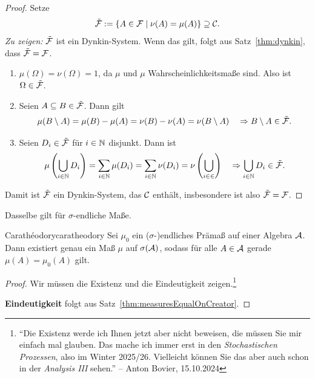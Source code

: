 \documentclass[language=ngerman]{../../Template/TemplateLecture}
\begin{document}
\begin{proof}
    Setze 
    \begin{equation}
        \tilde{\mathcal{F}} := \{A \in \mathcal{F} \mid \nu(A) = \mu(A)\} \supseteq \mathcal{C}.
    \end{equation}
    \emph{Zu zeigen:} $\tilde{\mathcal{F}}$ ist ein Dynkin-System. Wenn das gilt, folgt aus Satz~\ref{thm:dynkin}, dass $\tilde{\mathcal{F}} = \mathcal{F}$.
    \begin{enumerate}[(\greek*)]
        \item $\mu(\Omega) = \nu(\Omega) = 1$, da $\mu$ und $\mu$ Wahrscheinlichkeitsmaße sind. Also ist $\Omega \in \tilde{\mathcal{F}}$.
        \item Seien $A \subseteq B \in \tilde{\mathcal{F}}$. Dann gilt 
        \begin{equation}
            \mu(B \setminus A) = \mu(B) - \mu(A) = \nu(B) - \nu(A) = \nu(B \setminus A) \quad \Rightarrow B \setminus A \in \tilde{\mathcal{F}}.
        \end{equation}
        \item Seien $D_i \in \tilde{\mathcal{F}}$ für $i \in \mathbb{N}$ disjunkt. Dann ist 
        \begin{equation}
            \mu\left(\bigcup_{i \in \mathbb{N}} D_i\right) = \sum_{i \in \mathbb{N}} \mu(D_i) = \sum_{i \in \mathbb{N}} \nu(D_i) = \nu\left(\bigcup_{i \in \in}\right) \quad \Rightarrow \bigcup_{i \in \mathbb{N}} D_i \in \tilde{\mathcal{F}}.
        \end{equation}
    \end{enumerate}
    Damit ist $\tilde{\mathcal{F}}$ ein Dynkin-System, das $\mathcal{C}$ enthält, insbesondere ist also $\tilde{\mathcal{F}} = \mathcal{F}$.
\end{proof}

\begin{bemerkung}
    Dasselbe gilt für $\sigma$-endliche Maße.
\end{bemerkung}

\begin{thm}{Carathéodory}{caratheodory}
    Sei $\mu_0$ ein ($\sigma$-)endliches Prämaß auf einer Algebra $\mathcal{A}$. Dann existiert genau ein Maß $\mu$ auf $\sigma(\mathcal{A})$, sodass für alle $A \in \mathcal{A}$ gerade $\mu(A) = \mu_0(A)$ gilt.
\end{thm}

\begin{proof}
    Wir müssen die Existenz und die Eindeutigkeit zeigen.\footnote{\enquote{Die Existenz werde ich Ihnen jetzt aber nicht beweisen, die müssen Sie mir einfach mal glauben. Das mache ich immer erst in den \emph{Stochastischen Prozessen}, also im Winter 2025/26. Vielleicht können Sie das aber auch schon in der \emph{Analysis III} sehen.} -- Anton Bovier, 15.10.2024}

    \textbf{Eindeutigkeit} folgt aus Satz~\ref{thm:measuresEqualOnCreator}.
\end{proof}
\end{document}
